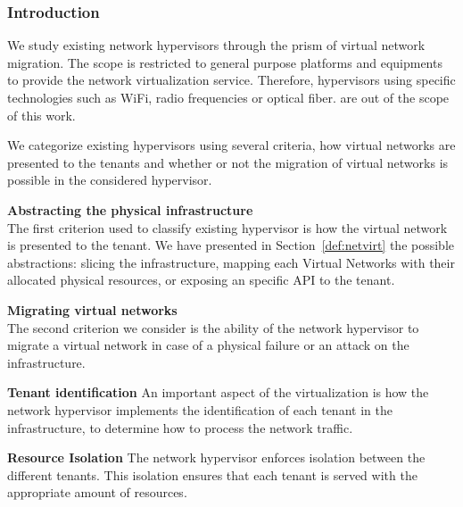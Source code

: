 \subsubsection{Introduction}
We study existing network hypervisors through the prism of virtual network migration.
The scope is restricted to general purpose platforms and equipments to provide the network virtualization service. Therefore, hypervisors using specific technologies such as WiFi, radio frequencies or optical fiber. are out of the scope of this work.

We categorize existing hypervisors using several criteria, how virtual networks are presented to the tenants and whether or not the migration of virtual networks is possible in the considered hypervisor.

\textbf{Abstracting the physical infrastructure\\}
The first criterion used to classify existing hypervisor is how the virtual network is presented to the tenant. We have presented in Section~\ref{def:netvirt} the possible abstractions: slicing the infrastructure, mapping each Virtual Networks with their allocated physical resources, or exposing an specific API to the tenant.

\textbf{Migrating virtual networks\\}
The second criterion we consider is the ability of the network hypervisor to migrate a virtual network in case of a physical failure or an attack on the infrastructure.

\textbf{Tenant identification}
An important aspect of the virtualization is how the network hypervisor implements the identification of each tenant in the infrastructure, to determine how to process the network traffic.

\textbf{Resource Isolation}
The network hypervisor enforces isolation between the different tenants.
This isolation ensures that each tenant is served with the appropriate amount of resources.

